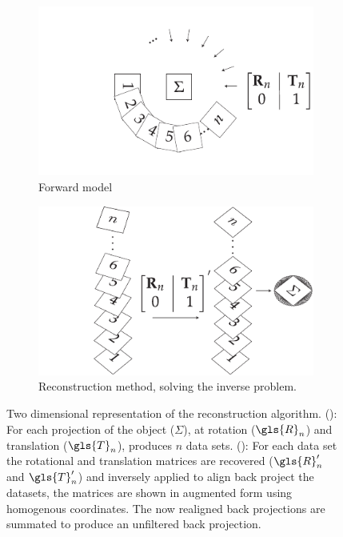 \begin{figure}
    \centering
    \begin{subfigure}[t]{\textwidth}
      \centering
      \includegraphics{flopt_algorithm_forward}
      \caption{Forward model}
      \label{fig:flopt_algorithm_forward}
    \end{subfigure}\vspace{0.05\textheight}
    \begin{subfigure}[t]{\textwidth}
      \centering
      \includegraphics{flopt_algorithm}
      \caption{Reconstruction method, solving the inverse problem.}
      \label{fig:flopt_algorithm_inverse}
    \end{subfigure}
    \caption{
    Two dimensional representation of the reconstruction algorithm.
    (): For each projection of the object (\(\Sigma\)), at rotation (\(\gls{R}_n\)) and translation (\(\gls{T}_n\)), produces \(n\) data sets.
    (): For each data set the rotational and translation matrices are recovered (\(\gls{R}_n'\) and \(\gls{T}_n'\))  and inversely applied to align back project the datasets, the matrices are shown in augmented form using homogenous coordinates.
    The now realigned back projections are summated to produce an unfiltered back projection.
    }
    \label{fig:flopt_algorithm}
\end{figure}

